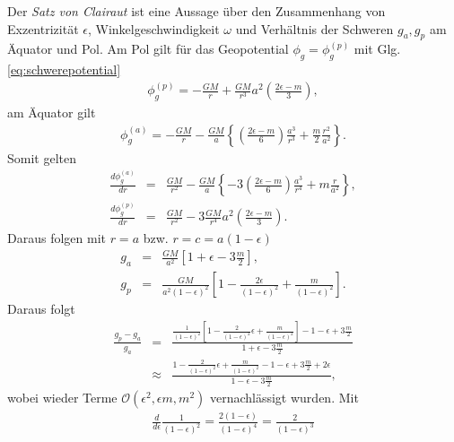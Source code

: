\documentclass{book}
\begin{document}
Der \textit{Satz von Clairaut} ist eine Aussage über den Zusammenhang von Exzentrizität $\epsilon$, Winkelgeschwindigkeit $\omega$ und Verhältnis der Schweren $g_a, g_p$ am Äquator und Pol. Am Pol gilt für das Geopotential $\phi_g = \phi_g^{(p)}$ mit Glg. \eqref{eq:schwerepotential}
%
\begin{eqnarray}
\phi_g^{(p)} = -\frac{GM}{r} + \frac{GM}{r^3}a^2\left(\frac{2\epsilon - m}{3}\right), 
\end{eqnarray}
%
am Äquator gilt
%
\begin{eqnarray}
\phi_g^{(a)} = -\frac{GM}{r} - \frac{GM}{a}\left\{\left(\frac{2\epsilon - m}{6}\right)\frac{a^3}{r^3} + \frac{m}{2}\frac{r^2}{a^2}\right\}.
\end{eqnarray}
%
Somit gelten
%
\begin{eqnarray}
\frac{d\phi_g^{(a)}}{dr} & = & \frac{GM}{r^2} - \frac{GM}{a}\left\{ - 3\left(\frac{2\epsilon - m}{6}\right)\frac{a^3}{r^4} + m\frac{r}{a^2}\right\},\\
\frac{d\phi_g^{(p)}}{dr} & = & \frac{GM}{r^2} - 3\frac{GM}{r^4}a^2\left(\frac{2\epsilon - m}{3}\right).
\end{eqnarray}
%
Daraus folgen mit $r = a$ bzw. $r = c = a\left(1 - \epsilon\right)$
%
\begin{eqnarray}
g_a & = & \frac{GM}{a^2}\left[1 + \epsilon - 3\frac{m}{2}\right],\\
g_p & = & \frac{GM}{a^2\left(1 - \epsilon\right)^2}\left[1 - \frac{2\epsilon}{\left(1 - \epsilon\right)^2} + \frac{m}{\left(1 - \epsilon\right)^2}\right].
\end{eqnarray}
%
Daraus folgt
%
\begin{eqnarray}
\frac{g_p - g_a}{g_a} & = & \frac{\frac{1}{\left(1 - \epsilon\right)^2}\left[1 - \frac{2}{\left(1 - \epsilon\right)^2}\epsilon + \frac{m}{\left(1 - \epsilon\right)^2}\right] - 1 - \epsilon + 3\frac{m}{2}}{1 + \epsilon - 3\frac{m}{2}}\nonumber\\
&\approx&\frac{1 - \frac{2}{\left(1 - \epsilon\right)^2}\epsilon + \frac{m}{\left(1 - \epsilon\right)^2} - 1 - \epsilon + 3\frac{m}{2} + 2\epsilon}{1 - \epsilon - 3\frac{m}{2}}, 
\end{eqnarray}
%
wobei wieder Terme $\mathcal{O}\left(\epsilon^2, \epsilon m, m^2\right)$ vernachlässigt wurden. Mit
%
\begin{eqnarray}
\frac{d}{d\epsilon}\frac{1}{\left(1 - \epsilon\right)^2} = \frac{2\left(1 - \epsilon\right)}{\left(1 - \epsilon\right)^4} = \frac{2}{\left(1 - \epsilon\right)^3}
\end{eqnarray}
\end{document}
